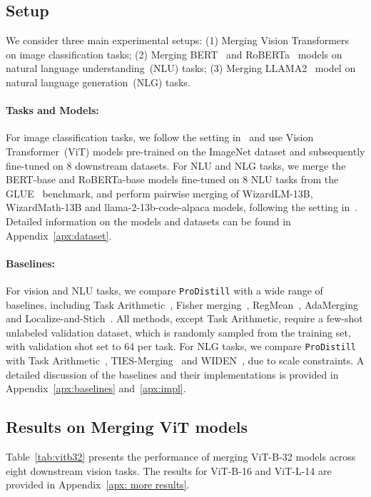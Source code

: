 \subsection{Setup}
\label{sec:setup}
We consider three main experimental setups: 
(1) Merging Vision Transformers~\citep{dosovitskiy2020image} on image classification tasks; 
(2) Merging BERT~\citep{devlin2018bert} and RoBERTa~\citep{liu2019roberta} models on natural language understanding~(NLU) tasks; 
(3) Merging LLAMA2~\citep{touvron2023llama2} model on natural language generation~(NLG) tasks. 

\paragraph{Tasks and Models:}
For image classification tasks, we follow the setting in~\citet{ilharco2022editing} and use Vision Transformer~(ViT) models pre-trained on the ImageNet dataset and subsequently fine-tuned on 8 downstream datasets. 
For NLU and NLG tasks, we merge the BERT-base and RoBERTa-base models fine-tuned on 8 NLU tasks from the GLUE~\citep{wang2018glue} benchmark, and perform pairwise merging of WizardLM-13B, WizardMath-13B and llama-2-13b-code-alpaca models, following the setting in~\citep{yu2024language}. 
Detailed information on the models and datasets can be found in Appendix~\ref{apx:dataset}.

\paragraph{Baselines:}
For vision and NLU tasks, we compare \texttt{ProDistill} with a wide range of baselines, including 
Task Arithmetic~\citep{ilharco2022editing}, 
Fisher merging~\citep{matena2022merging},
RegMean~\citep{jin2022dataless}, 
AdaMerging~\citep{yang2023adamerging} and Localize-and-Stich~\citep{he2024localize}. 
All methods, except Task Arithmetic, require a few-shot unlabeled validation dataset, which is randomly sampled from the training set, with validation shot set to 64 per task.
For NLG tasks, we compare \texttt{ProDistill} with Task Arithmetic~\citep{ilharco2022editing}, TIES-Merging~\citep{yadav2024ties} and WIDEN~\citep{yu2024extend}, due to scale constraints.
A detailed discussion of the baselines and their implementations is provided in Appendix~\ref{apx:baselines} and~\ref{apx:impl}.



\subsection{Results on Merging ViT models}
Table~\ref{tab:vitb32} presents the performance of merging ViT-B-32 models across eight downstream vision tasks.
The results for ViT-B-16 and ViT-L-14 are provided in Appendix~\ref{apx: more results}.

